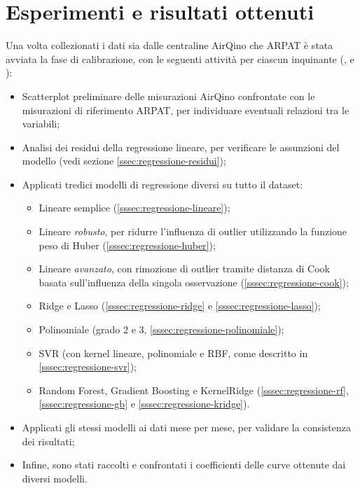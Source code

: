 \clearpage
\section{Esperimenti e risultati ottenuti}\label{sec:esperimenti}
Una volta collezionati i dati sia dalle centraline AirQino che ARPAT è stata avviata la fase di calibrazione, con le seguenti attività per ciascun inquinante (,  e ):

\begin{itemize}
  \item Scatterplot preliminare delle misurazioni AirQino confrontate con le misurazioni di riferimento ARPAT, per individuare eventuali relazioni tra le variabili;
  \item Analisi dei residui della regressione lineare, per verificare le assunzioni del modello (vedi sezione \ref{ssec:regressione-residui});
  \item Applicati tredici modelli di regressione diversi su tutto il dataset:
        \begin{itemize}
          \item Lineare semplice (\ref{sssec:regressione-lineare});
          \item Lineare \textit{robusto}, per ridurre l'influenza di outlier utilizzando la funzione peso di Huber (\ref{sssec:regressione-huber});
          \item Lineare \textit{avanzato}, con rimozione di outlier tramite distanza di Cook basata sull'influenza della singola osservazione (\ref{sssec:regressione-cook});
          \item Ridge e Lasso (\ref{sssec:regressione-ridge} e \ref{sssec:regressione-lasso});
          \item Polinomiale (grado 2 e 3, \ref{sssec:regressione-polinomiale});
          \item SVR (con kernel lineare, polinomiale e RBF, come descritto in \ref{sssec:regressione-svr});
          \item Random Forest, Gradient Boosting e KernelRidge (\ref{sssec:regressione-rf}, \ref{sssec:regressione-gb} e \ref{sssec:regressione-kridge}).
        \end{itemize}
    \item Applicati gli stessi modelli ai dati mese per mese, per validare la consistenza dei risultati;
    \item Infine, sono stati raccolti e confrontati i coefficienti delle curve ottenute dai diversi modelli.
\end{itemize}

